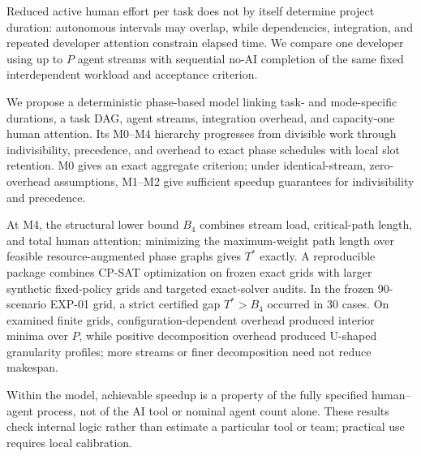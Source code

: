 Reduced active human effort per task does not by itself determine project
duration: autonomous intervals may overlap, while dependencies, integration,
and repeated developer attention constrain elapsed time. We compare one
developer using up to $P$ agent streams with sequential no-AI completion of the
same fixed interdependent workload and acceptance criterion.

We propose a deterministic phase-based model linking task- and mode-specific
durations, a task DAG, agent streams, integration overhead, and capacity-one
human attention. Its M0--M4 hierarchy progresses from divisible work through
indivisibility, precedence, and overhead to exact phase schedules with local
slot retention. M0 gives an exact aggregate criterion; under identical-stream,
zero-overhead assumptions, M1--M2 give sufficient speedup guarantees for
indivisibility and precedence.

At M4, the structural lower bound $B_4$ combines stream load, critical-path
length, and total human attention; minimizing the maximum-weight path length
over feasible resource-augmented phase graphs gives $T^*$ exactly. A
reproducible package combines CP-SAT optimization on frozen exact grids with
larger synthetic fixed-policy grids and targeted exact-solver audits. In the
frozen 90-scenario EXP-01 grid, a strict certified gap $T^*>B_4$ occurred in 30
cases. On examined finite grids, configuration-dependent overhead produced
interior minima over $P$, while positive decomposition overhead produced
U-shaped granularity profiles; more streams or finer decomposition need not
reduce makespan.

Within the model, achievable speedup is a property of the fully specified
human--agent process, not of the AI tool or nominal agent count alone. These
results check internal logic rather than estimate a particular tool or team;
practical use requires local calibration.
